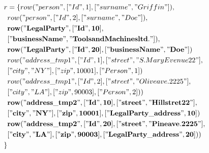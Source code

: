 \documentclass[11pt]{article}
\begin{document}
\begin{align*}
r &=\{ row("person", ["Id", 1], ["surname", "Griffin"]), \\
& row("person", ["Id", 2], ["surname", "Doe"]), \\
& \mathbf{row("LegalParty", ["Id", 10],} \\
& \mathbf{["businessName", "Tools and Machines ltd."])}, \\
& \mathbf{row("LegalParty", ["Id", 20], ["businessName", "Doe"])}\\
& row("address\_tmp1", ["Id", 1], ["street", "S. Mary Evenue 22"], \\ 
& ["city", "NY"], ["zip", 10001], ["Person", 1]) \\
& row("address\_tmp1", ["Id", 2], ["street", "Olive ave. 2225"], \\
& ["city", "LA"], ["zip", 90003], ["Person", 2]) )\\
& \mathbf{row("address\_tmp2", ["Id", 10], ["street", "Hill stret 22"], }\\
& \mathbf{["city", "NY"], ["zip", 10001], ["LegalParty\_address", 10]}) \\
& \mathbf{row("address\_tmp2", ["Id", 20], ["street", "Pine ave. 2225"],} \\
& \mathbf{["city", "LA"], ["zip", 90003], ["LegalParty\_address", 20])} )\\
\}
\end{align*}
\end{document}
